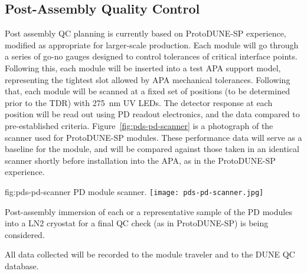 


\subsection{Post-Assembly Quality Control}

Post assembly QC planning is currently based on ProtoDUNE-SP experience, modified as appropriate for larger-scale production.  Each module will go through a series of go-no gauges designed to control tolerances of critical interface points.  Following this, each module will be inserted into a test APA support model, representing the tightest slot allowed by APA mechanical tolerances.  Following that, each module will be scanned at a fixed set of positions (to be determined prior to the TDR) with \SI{275}{nm} UV LEDs.  The detector response at each position will be read out using PD readout electronics, and the data compared to pre-established criteria.  Figure~\ref{fig:pds-pd-scanner} is a photograph of the scanner used for ProtoDUNE-SP modules. These performance data will serve as a baseline for the module, and will be compared against those taken in an identical scanner shortly before installation into the APA, as in the ProtoDUNE-SP experience. 

\begin{dunefigure}{fig:pds-pd-scanner}
{PD module scanner.}
  \texttt{[image: pds-pd-scanner.jpg]}
\end{dunefigure}

Post-assembly immersion of each or a representative sample of the PD modules into a LN2 cryostat for a final QC check (as in ProtoDUNE-SP) is being considered.

All data collected will be recorded to the module traveler and to the DUNE QC database.







